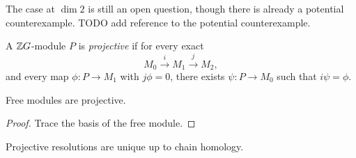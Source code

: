 The case at \(\dim 2\) is still an open question, though there is already a potential counterexample. 
TODO add reference to the potential counterexample.

\begin{definition}
    \label{def:projective-module}
    A \(\mathbb{Z} G\)-module \(P\) is \emph{projective} if for every exact 
    \[ M_0 \xrightarrow{i} M_1 \xrightarrow{j} M_2 ,\]
    and every map \(\phi : P \to M_1\) with \(j\phi =0\), there exists \(\psi:P \to M_0\) such that \(i\psi = \phi\).
\begin{center}
\end{center}
\end{definition}

\begin{lemma}
    \label{lem:free-module-is-projective}
    Free modules are projective.
\end{lemma}
\begin{proof}
    Trace the basis of the free module.
\end{proof}

\begin{theorem}
    \label{thm:uniqueness-of-projective-resolution}
    Projective resolutions are unique up to chain homology.
\end{theorem}

